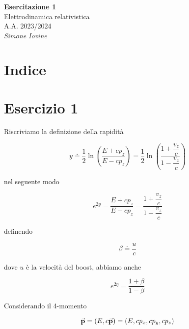 \documentclass[12pt,notitlepage]{report}
\makeatletter
\newcommand*{\toccontents}{\@starttoc{toc}}
\makeatother
\begin{document}
	

\begin{center}
	{\Large
		\textbf{Esercitazione 1} \\
			Elettrodinamica relativistica \\
			A.A. 2023/2024 \\
			\vspace{0.7cm}
			\textit{Simone Iovine}
		}
\end{center}

\vspace{2cm}

%

\section*{Indice}

\toccontents

%

\section{Esercizio 1}

Riscriviamo la definizione della rapidità

\begin{equation}
	y \doteq \dfrac{1}{2} \ln(\dfrac{E + c p_{z}}{E - c p_{z}}) %
	= \dfrac{1}{2} \ln(\dfrac{1 + \dfrac{v_{z}}{c}}{1 - \dfrac{v_{z}}{c}})
\end{equation}

nel seguente modo

\begin{equation}
	e^{2 y} = \dfrac{E + c p_{z}}{E - c p_{z}} %
	= \dfrac{1 + \dfrac{v_{z}}{c}}{1 - \dfrac{v_{z}}{c}}
\end{equation}

definendo

\begin{equation}
	\beta \doteq \dfrac{u}{c}
\end{equation}

dove $u$ è la velocità del boost, abbiamo anche

\begin{equation}
	e^{2 \eta} = \dfrac{1 + \beta}{1 - \beta}
\end{equation}

Considerando il 4-momento

\begin{equation}
	\va{p} = (E, c \va{p}) %
	= (E, c p_{x}, c p_{y}, c p_{z})
\end{equation}
\end{document}
